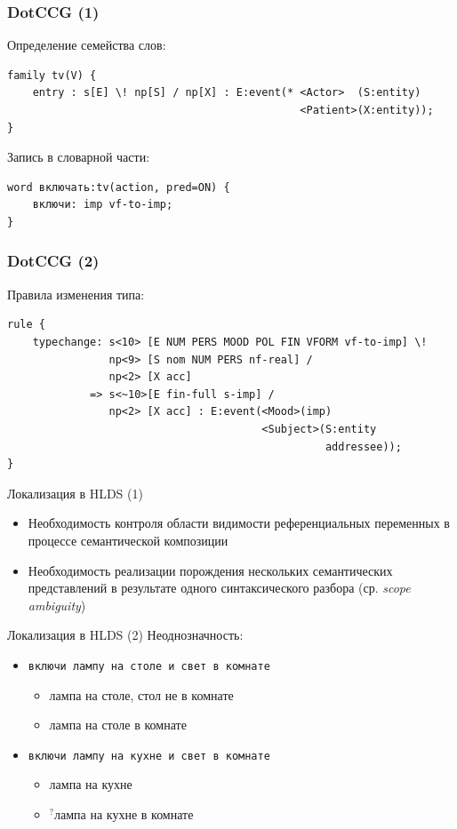 \documentclass{beamer}
\begin{document}
\begin{frame}[fragile]
\frametitle{DotCCG (1)}
Определение семейства слов:
{\footnotesize \begin{verbatim}
family tv(V) {
    entry : s[E] \! np[S] / np[X] : E:event(* <Actor>  (S:entity) 
                                              <Patient>(X:entity));
}
\end{verbatim}}
\bigskip
\bigskip
Запись в словарной части:
{\footnotesize \begin{verbatim}
word включать:tv(action, pred=ON) {
    включи: imp vf-to-imp;
}
\end{verbatim}}
\end{frame}

\begin{frame}[fragile]
\frametitle{DotCCG (2)}
Правила изменения типа:
{\footnotesize \begin{verbatim}
rule {
    typechange: s<10> [E NUM PERS MOOD POL FIN VFORM vf-to-imp] \! 
                np<9> [S nom NUM PERS nf-real] / 
                np<2> [X acc]
             => s<~10>[E fin-full s-imp] / 
                np<2> [X acc] : E:event(<Mood>(imp) 
                                        <Subject>(S:entity 
                                                  addressee));
}
\end{verbatim}}
\end{frame}

\begin{frame}{Локализация в HLDS (1)}
\begin{itemize}
	\item Необходимость контроля области видимости референциальных переменных в процессе семантической композиции
	\item Необходимость реализации порождения нескольких семантических представлений в результате одного синтаксического разбора (ср. \textit{scope ambiguity})
\end{itemize}
\end{frame}

\begin{frame}{Локализация в HLDS (2)}
Неоднозначность:\\
\bigskip
\begin{itemize}
	\item \texttt{включи лампу на столе и свет в комнате}
		\begin{itemize}
			\item {\footnotesize лампа на столе, стол не в комнате}
			\item {\footnotesize лампа на столе в комнате}
		\end{itemize}
	\bigskip
	\item \texttt{включи лампу на кухне и свет в комнате}
		\begin{itemize}
			\item {\footnotesize лампа на кухне}
			\item {\footnotesize $^?$лампа на кухне в комнате}
		\end{itemize}
\end{itemize}
\end{frame}
\end{document}
